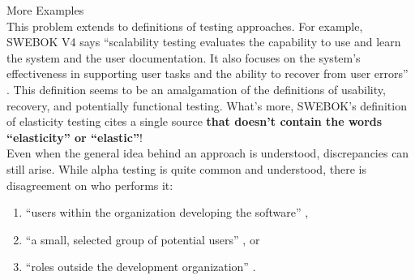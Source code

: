 \documentclass[22pt]{beamer}
\begin{document}
\begin{frame}[fragile]
\begin{textblock}{7.25}
\begin{block}{\fontsize{37}{20}\selectfont More Examples}
            \quad\\ %

            This problem extends to definitions of testing
            approaches. For example, SWEBOK V4 says ``scalability testing
            evaluates the capability to use and learn the system and the user
            documentation. It also focuses on the system's effectiveness in
            supporting user tasks and the ability to recover from user errors''
            \cite[p.~5-9]{SWEBOK2024}. This definition seems to be an
            amalgamation of the definitions of usability, recovery, and
            potentially functional testing. What's more, SWEBOK's definition
            of elasticity testing cites a single source \cite[p.~5-9]{SWEBOK2024}
            \textbf{that doesn't contain the words ``elasticity'' or ``elastic''}!
            \vspace{7mm}\\
            Even when the general idea behind an approach is understood,
            discrepancies can still arise. While alpha testing is quite common
            and understood, there is disagreement on who performs it:
            \begin{enumerate}
                \item ``users within the organization developing the software''
                      \cite[p.~17]{IEEE2017},
                \item ``a small, selected group of potential users''
                      \cite[p.~5-8]{SWEBOK2024}, or
                \item ``roles outside the development organization''
                      \cite{ISTQB}.
            \end{enumerate}
            \vspace{5mm}
        \end{block}


\end{textblock}
\end{frame}
\end{document}
